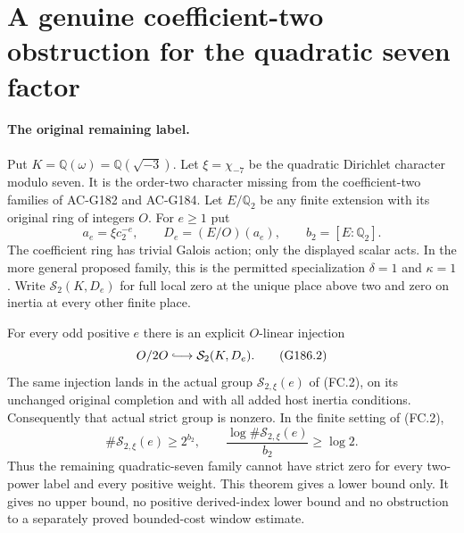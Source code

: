 \section{A genuine coefficient-two obstruction for the quadratic seven factor}
\label{sec:quadratic-seven-coefficient-two-obstruction}

\paragraph{The original remaining label.}
Put $K=\mathbb Q(\omega)=\mathbb Q(\sqrt{-3})$.
Let $\xi=\chi_{-7}$ be the quadratic Dirichlet character modulo seven.
It is the order-two character missing from the coefficient-two
families of AC-G182 and AC-G184.
Let $E/\mathbb Q_2$ be any finite extension with its original
ring of integers $O$.  For $e\geq1$ put
\[
       a_e=\xi c_2^{-e},\qquad D_e=(E/O)(a_e),
       \qquad b_2=[E:\mathbb Q_2].
 \tag{G186.1}
\]
The coefficient ring has trivial Galois action; only the displayed
scalar acts.  In the more general proposed family, this is the
permitted specialization $\delta=1$ and $\kappa=1$.
Write $\mathcal S_2(K,D_e)$ for full local zero at the unique
place above two and zero on inertia at every other finite place.

\begin{theorem}
\label{AC-G186}
For every odd positive $e$ there is an explicit $O$-linear injection
\[
                 O/2O\lhook\joinrel\longrightarrow
                           \mathcal S_2(K,D_e).
 \tag{G186.2}
\]
The same injection lands in the actual group
$\mathcal S_{2,\xi}(e)$ of (FC.2), on its unchanged original
completion and with all added host inertia conditions.
Consequently that actual strict group is nonzero.  In the finite
setting of (FC.2),
\[
 \#\mathcal S_{2,\xi}(e)\geq2^{b_2},\qquad
 \frac{\log\#\mathcal S_{2,\xi}(e)}{b_2}\geq\log2.
 \tag{G186.3}
\]
Thus the remaining quadratic-seven family cannot have strict zero
for every two-power label and every positive weight.
This theorem gives a lower bound only.  It gives no upper bound,
no positive derived-index lower bound and no obstruction to a
separately proved bounded-cost window estimate.
\end{theorem}

